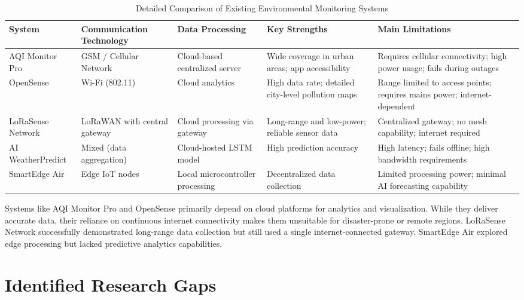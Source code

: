 \begin{table}[H]
\centering
\caption{Detailed Comparison of Existing Environmental Monitoring Systems}
\label{tab:existing_systems}
\begin{tabular}{|p{2.8cm}|p{2.8cm}|p{2.8cm}|p{2.5cm}|p{3.5cm}|}
\hline
\textbf{System} & \textbf{Communication Technology} & \textbf{Data Processing} & \textbf{Key Strengths} & \textbf{Main Limitations} \\
\hline
AQI Monitor Pro \cite{aqimonitor2021} & GSM / Cellular Network & Cloud-based centralized server & Wide coverage in urban areas; app accessibility & Requires cellular connectivity; high power usage; fails during outages \\
\hline
OpenSense \cite{opensense2022} & Wi-Fi (802.11) & Cloud analytics & High data rate; detailed city-level pollution maps & Range limited to access points; requires mains power; internet-dependent \\
\hline
LoRaSense Network \cite{lorasense2023} & LoRaWAN with central gateway & Cloud processing via gateway & Long-range and low-power; reliable sensor data & Centralized gateway; no mesh capability; internet required \\
\hline
AI WeatherPredict \cite{aiweather2023} & Mixed (data aggregation) & Cloud-hosted LSTM model & High prediction accuracy & High latency; fails offline; high bandwidth requirements \\
\hline
SmartEdge Air \cite{smartedge2023} & Edge IoT nodes & Local microcontroller processing & Decentralized data collection & Limited processing power; minimal AI forecasting capability \\
\hline
\end{tabular}
\end{table}

Systems like AQI Monitor Pro and OpenSense primarily depend on cloud platforms for analytics and visualization. While they deliver accurate data, their reliance on continuous internet connectivity makes them unsuitable for disaster-prone or remote regions. LoRaSense Network successfully demonstrated long-range data collection but still used a single internet-connected gateway. SmartEdge Air explored edge processing but lacked predictive analytics capabilities.

\section{Identified Research Gaps}

